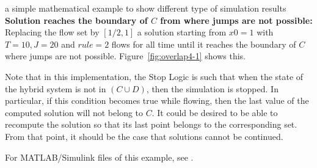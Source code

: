 \begin{example}{a simple mathematical example to show different type of simulation results}
{\bf Solution reaches the boundary of $C$ from where jumps are not possible:}
Replacing the flow set by  $[1/2,1]$
a solution starting from $x0=1$ with $T=10,J=20$ and $rule = 2$
flows for all time until it reaches the boundary of
$C$ where jumps are not possible. Figure~\ref{fig:overlap4-1}
shows this.

Note that in this implementation, the Stop Logic is such that when the
state of the hybrid system is not in $(C \cup D)$, then the
simulation is stopped. In particular, if this condition becomes true
while flowing, then the last value of the computed solution will not
belong to $C$. It
could be desired to be able to recompute the solution so that its last
point belongs to the corresponding set. From that point, it should be
the case that solutions cannot be continued.

For MATLAB/Simulink files of this example, see .

\end{example}



